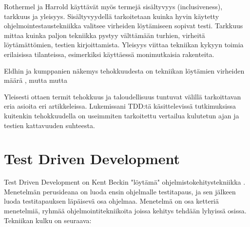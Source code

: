 \documentclass[finnish]{tktltiki2}
\theoremstyle{definition}
\theoremstyle{remark}
\begin{document}
Rothermel ja Harrold käyttävät myös termejä sisältyvyys (inclusiveness), tarkkuus ja yleisyys. Sisältyvyydellä  tarkoitetaan kuinka hyvin käytetty ohjelmointestaustekniikka valitsee virheiden löytämiseen sopivat testi. Tarkkuus mittaa kuinka paljon tekniikka pystyy välttämään turhien, virheitä löytämättömien, testien kirjoittamista. Yleisyys viittaa tekniikan kykyyn toimia erilaisissa tilanteissa, esimerkiksi käyttäessä monimutkaisia rakenteita.\cite{Rothermel96}

Eldhin ja kumppanien näkemys tehokkuudesta on tekniikan löytämien virheiden määrä \cite{Eldh06}, mutta mutta

Yleisesti ottaen termit tehokkuus ja taloudellisuus tuntuvat välillä tarkoittavan eria asioita eri artikkeleissa. Lukemissani TDD:tä käsittelevissä tutkimuksissa kuitenkin tehokkuudella on useimmiten tarkoitettu vertailua kulutetun ajan ja testien kattavuuden suhteesta.





\section{Test Driven Development}


Test Driven Development on Kent Beckin "löytämä" ohjelmistokehitystekniikka \cite{Beck03}. Menetelmän perusideana on luoda ensin ohjelmalle testitapaus, ja sen jälkeen luoda testitapauksen läpäisevä osa ohjelmaa. Menetelmä on osa ketteriä menetelmiä, ryhmää ohjelmointitekniikoita joissa kehitys tehdään lyhyissä osissa. Tekniikan kulku on seuraava:
\end{document}
